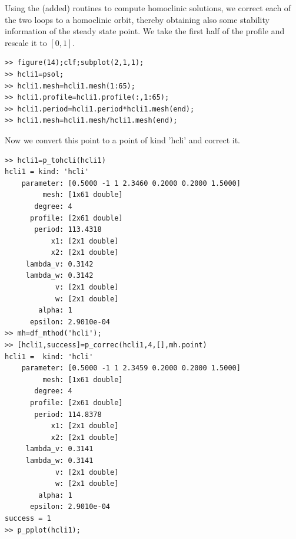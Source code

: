 \documentclass[10pt]{article}
\begin{document}
{Using the (added) routines to compute homoclinic solutions, we
correct each of the two loops to a homoclinic orbit, thereby obtaining
also some stability information of the steady state point.
We take the first half of the profile and rescale it to $[0,1]$.
{\small\begin{verbatim}
>> figure(14);clf;subplot(2,1,1);
>> hcli1=psol;
>> hcli1.mesh=hcli1.mesh(1:65);
>> hcli1.profile=hcli1.profile(:,1:65);
>> hcli1.period=hcli1.period*hcli1.mesh(end);
>> hcli1.mesh=hcli1.mesh/hcli1.mesh(end);
\end{verbatim}}
Now we convert this point to a point of kind 'hcli' and correct it.
{\small\begin{verbatim}
>> hcli1=p_tohcli(hcli1)
hcli1 = kind: 'hcli'
    parameter: [0.5000 -1 1 2.3460 0.2000 0.2000 1.5000]
         mesh: [1x61 double]
       degree: 4
      profile: [2x61 double]
       period: 113.4318
           x1: [2x1 double]
           x2: [2x1 double]
     lambda_v: 0.3142
     lambda_w: 0.3142
            v: [2x1 double]
            w: [2x1 double]
        alpha: 1
      epsilon: 2.9010e-04
>> mh=df_mthod('hcli');
>> [hcli1,success]=p_correc(hcli1,4,[],mh.point)
hcli1 =  kind: 'hcli'
    parameter: [0.5000 -1 1 2.3459 0.2000 0.2000 1.5000]
         mesh: [1x61 double]
       degree: 4
      profile: [2x61 double]
       period: 114.8378
           x1: [2x1 double]
           x2: [2x1 double]
     lambda_v: 0.3141
     lambda_w: 0.3141
            v: [2x1 double]
            w: [2x1 double]
        alpha: 1
      epsilon: 2.9010e-04
success = 1
>> p_pplot(hcli1);
\end{verbatim}}

}
\end{document}
